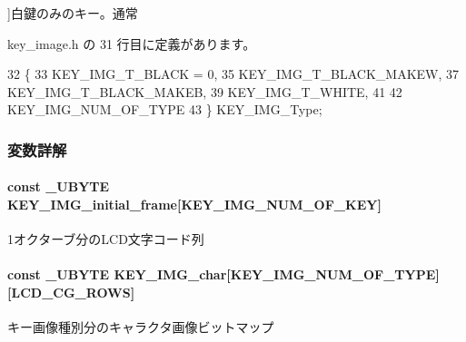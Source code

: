 \begin{Desc}
\begin{description}
{}]白鍵のみのキー。通常 \item[{\em 
K\+E\+Y\+\_\+\+I\+M\+G\+\_\+\+N\+U\+M\+\_\+\+O\+F\+\_\+\+T\+Y\+P\+E\label{key__image_8h_ac00361390d99656f240e21132bd160cc_ac00361390d99656f240e21132bd160ccab5fb40b7e7e274990691f53fff111986}
}]\end{description}
\end{Desc}


 key\+\_\+image.\+h の 31 行目に定義があります。


\begin{DoxyCode}
32 \{
33     KEY_IMG_T_BLACK = 0,
35     KEY_IMG_T_BLACK_MAKEW,
37     KEY_IMG_T_BLACK_MAKEB,
39     KEY_IMG_T_WHITE,
41     
42     KEY_IMG_NUM_OF_TYPE
43 \} KEY_IMG_Type;
\end{DoxyCode}


\subsubsection{変数詳解}
\paragraph[{K\+E\+Y\+\_\+\+I\+M\+G\+\_\+initial\+\_\+frame}]{\setlength{\rightskip}{0pt plus 5cm}const \+\_\+\+U\+B\+Y\+T\+E K\+E\+Y\+\_\+\+I\+M\+G\+\_\+initial\+\_\+frame\mbox{[}{\bf K\+E\+Y\+\_\+\+I\+M\+G\+\_\+\+N\+U\+M\+\_\+\+O\+F\+\_\+\+K\+E\+Y}\mbox{]}}\label{key__image_8h_aac267b2e32d4518bd2661895e8667365_aac267b2e32d4518bd2661895e8667365}


1オクターブ分の\+L\+C\+D文字コード列 

\paragraph[{K\+E\+Y\+\_\+\+I\+M\+G\+\_\+char}]{\setlength{\rightskip}{0pt plus 5cm}const \+\_\+\+U\+B\+Y\+T\+E K\+E\+Y\+\_\+\+I\+M\+G\+\_\+char\mbox{[}{\bf K\+E\+Y\+\_\+\+I\+M\+G\+\_\+\+N\+U\+M\+\_\+\+O\+F\+\_\+\+T\+Y\+P\+E}\mbox{]}\mbox{[}L\+C\+D\+\_\+\+C\+G\+\_\+\+R\+O\+W\+S\mbox{]}}\label{key__image_8h_ad8bcb9deb96dec3ecacf43106f0f845d_ad8bcb9deb96dec3ecacf43106f0f845d}


キー画像種別分のキャラクタ画像ビットマップ 

